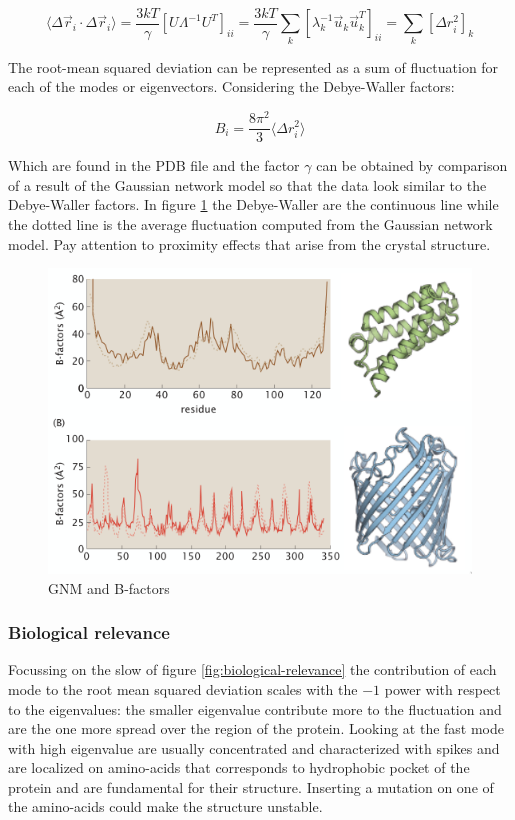 		$$\langle\Delta\vec{r}_i\cdot\Delta\vec{r}_i\rangle = \frac{3kT}{\gamma}[U\Lambda^{-1}U^{T}]_{ii} = \frac{3kT}{\gamma}\sum\limits_{k}[\lambda_k^{-1}\vec{u}_k\vec{u}_k^T]_{ii} = \sum\limits_{k}[\Delta r_i^2]_k$$

		The root-mean squared deviation can be represented as a sum of fluctuation for each of the modes or eigenvectors.
		Considering the Debye-Waller factors:

		$$B_i = \frac{8\pi^2}{3}\langle\Delta r_i^2\rangle$$

		Which are found in the PDB file and the factor $\gamma$ can be obtained by comparison of a result of the Gaussian network model so that the data look similar to the Debye-Waller factors.
		In figure \ref{fig:gnn-b-factors} the Debye-Waller are the continuous line while the dotted line is the average fluctuation computed from the Gaussian network model.
		Pay attention to proximity effects that arise from the crystal structure.

		\begin{figure}[H]
			\includegraphics[width=\textwidth]{gnm-b-factors}
			\caption{GNM and B-factors}
			\label{fig:gnn-b-factors}
		\end{figure}

		\subsubsection{Biological relevance}
		Focussing on the slow of figure \ref{fig:biological-relevance} the contribution of each mode to the root mean squared deviation scales with the $-1$ power with respect to the eigenvalues: the smaller eigenvalue contribute more to the fluctuation and are the one more spread over the region of the protein.
		Looking at the fast mode with high eigenvalue are usually concentrated and characterized with spikes and are localized on amino-acids that corresponds to hydrophobic pocket of the protein and are fundamental for their structure.
		Inserting a mutation on one of the amino-acids could make the structure unstable.

